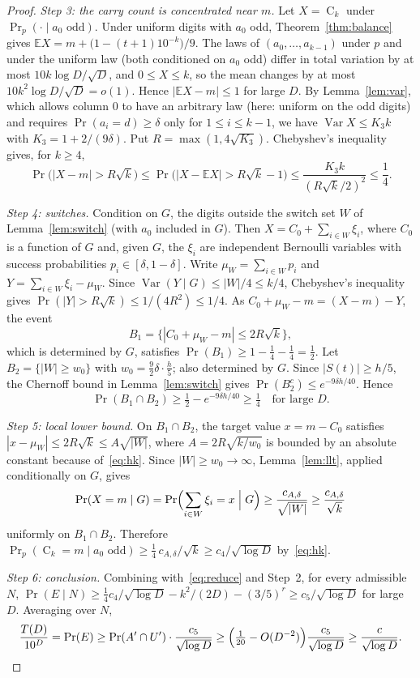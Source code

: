 \documentclass[11pt]{article}
\theoremstyle{definition}
\theoremstyle{remark}
\newcommand{\C}{\operatorname{C}}
\begin{document}
\begin{proof}
\emph{Step 3: the carry count is concentrated near $m$.} Let $X=\C_k$ under
$\Pr_p(\cdot\mid a_0\text{ odd})$. Under uniform digits with $a_0$ odd,
Theorem~\ref{thm:balance} gives $\mathbb EX=m+\bigl(1-(t+1)10^{-k}\bigr)/9$.
The laws of $(a_0,\dots,a_{k-1})$ under $p$ and under the uniform law (both
conditioned on $a_0$ odd) differ in total variation by at most
$10k\log D/\sqrt D$, and $0\le X\le k$, so the mean changes by at most
$10k^2\log D/\sqrt D=o(1)$. Hence $|\mathbb EX-m|\le1$ for large $D$. By
Lemma~\ref{lem:var}, which allows column $0$ to have an arbitrary law (here:
uniform on the odd digits) and requires $\Pr(a_i=d)\ge\delta$ only for
$1\le i\le k-1$, we have $\operatorname{Var}X\le K_3k$ with
$K_3=1+2/(9\delta)$. Put $R=\max(1,4\sqrt{K_3})$. Chebyshev's
inequality gives, for $k\ge4$,
\[
  \Pr\bigl(|X-m|>R\sqrt k\bigr)\le\Pr\bigl(|X-\mathbb EX|>R\sqrt k-1\bigr)
  \le\frac{K_3k}{(R\sqrt k/2)^2}\le\frac14 .
\]

\emph{Step 4: switches.} Condition on $G$, the digits outside the switch set
$W$ of Lemma~\ref{lem:switch} (with $a_0$ included in $G$). Then
$X=C_0+\sum_{i\in W}\xi_i$, where $C_0$ is a function of $G$ and, given $G$,
the $\xi_i$ are independent Bernoulli variables with success probabilities
$p_i\in[\delta,1-\delta]$. Write $\mu_W=\sum_{i\in W}p_i$ and
$Y=\sum_{i\in W}\xi_i-\mu_W$. Since $\operatorname{Var}(Y\mid G)\le|W|/4\le k/4$,
Chebyshev's inequality gives $\Pr(|Y|>R\sqrt k)\le1/(4R^2)\le1/4$. As
$C_0+\mu_W-m=(X-m)-Y$, the event
\[
  B_1=\bigl\{|C_0+\mu_W-m|\le2R\sqrt k\bigr\},
\]
which is determined by $G$, satisfies $\Pr(B_1)\ge1-\tfrac14-\tfrac14=\tfrac12$.
Let $B_2=\{|W|\ge w_0\}$ with $w_0=\tfrac92\delta\cdot\tfrac h5$; also determined
by $G$. Since $|S(t)|\ge h/5$, the Chernoff bound in Lemma~\ref{lem:switch}
gives $\Pr(B_2^c)\le e^{-9\delta h/40}$. Hence
\[
  \Pr(B_1\cap B_2)\ge\tfrac12-e^{-9\delta h/40}\ge\tfrac14\quad\text{for large }D.
\]

\emph{Step 5: local lower bound.} On $B_1\cap B_2$, the target value
$x=m-C_0$ satisfies $|x-\mu_W|\le2R\sqrt k\le A\sqrt{|W|}$, where
$A=2R\sqrt{k/w_0}$ is bounded by an absolute constant because of~\eqref{eq:hk}.
Since $|W|\ge w_0\to\infty$, Lemma~\ref{lem:llt}, applied conditionally on $G$,
gives
\[
  \Pr(X=m\mid G)=\Pr\Bigl(\sum_{i\in W}\xi_i=x\Bigm|G\Bigr)
  \ge\frac{c_{A,\delta}}{\sqrt{|W|}}\ge\frac{c_{A,\delta}}{\sqrt k}
\]
uniformly on $B_1\cap B_2$. Therefore
$\Pr_p(\C_k=m\mid a_0\text{ odd})\ge\tfrac14\,c_{A,\delta}/\sqrt k\ge c_4/\sqrt{\log D}$
by~\eqref{eq:hk}.

\emph{Step 6: conclusion.} Combining with~\eqref{eq:reduce} and Step~2, for
every admissible $N$,
$\Pr(E\mid N)\ge\tfrac14c_4/\sqrt{\log D}-k^2/(2D)-(3/5)^r\ge c_5/\sqrt{\log D}$
for large $D$. Averaging over $N$,
\[
  \frac{T(D)}{10^D}=\Pr(E)\ge\Pr(A'\cap U')\cdot\frac{c_5}{\sqrt{\log D}}
  \ge\Bigl(\tfrac1{20}-O(D^{-2})\Bigr)\frac{c_5}{\sqrt{\log D}}
  \ge\frac{c}{\sqrt{\log D}}. \qedhere
\]
\end{proof}
\end{document}

